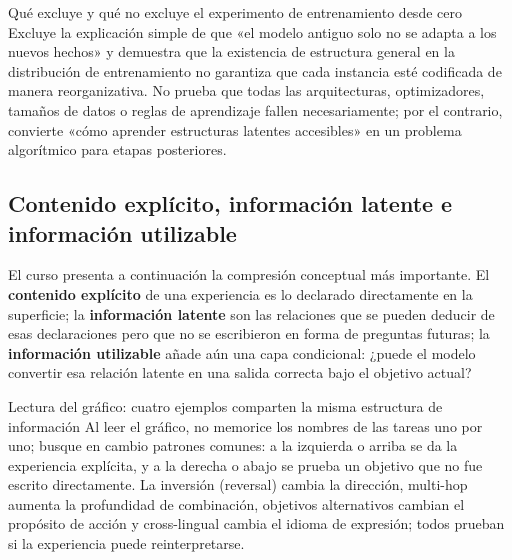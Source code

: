 \begin{importantbox}{Qué excluye y qué no excluye el experimento de entrenamiento desde cero}
Excluye la explicación simple de que «el modelo antiguo solo no se adapta a los nuevos hechos» y demuestra que la existencia de estructura general en la distribución de entrenamiento no garantiza que cada instancia esté codificada de manera reorganizativa. No prueba que todas las arquitecturas, optimizadores, tamaños de datos o reglas de aprendizaje fallen necesariamente; por el contrario, convierte «cómo aprender estructuras latentes accesibles» en un problema algorítmico para etapas posteriores.
\end{importantbox}

\subsection{Contenido explícito, información latente e información utilizable}

El curso presenta a continuación la compresión conceptual más importante. El \textbf{contenido explícito} de una experiencia es lo declarado directamente en la superficie; la \textbf{información latente} son las relaciones que se pueden deducir de esas declaraciones pero que no se escribieron en forma de preguntas futuras; la \textbf{información utilizable} añade aún una capa condicional: ¿puede el modelo convertir esa relación latente en una salida correcta bajo el objetivo actual?


\begin{knowledgebox}{Lectura del gráfico: cuatro ejemplos comparten la misma estructura de información}
Al leer el gráfico, no memorice los nombres de las tareas uno por uno; busque en cambio patrones comunes: a la izquierda o arriba se da la experiencia explícita, y a la derecha o abajo se prueba un objetivo que no fue escrito directamente. La inversión (reversal) cambia la dirección, multi-hop aumenta la profundidad de combinación, objetivos alternativos cambian el propósito de acción y cross-lingual cambia el idioma de expresión; todos prueban si la experiencia puede reinterpretarse.
\end{knowledgebox}

